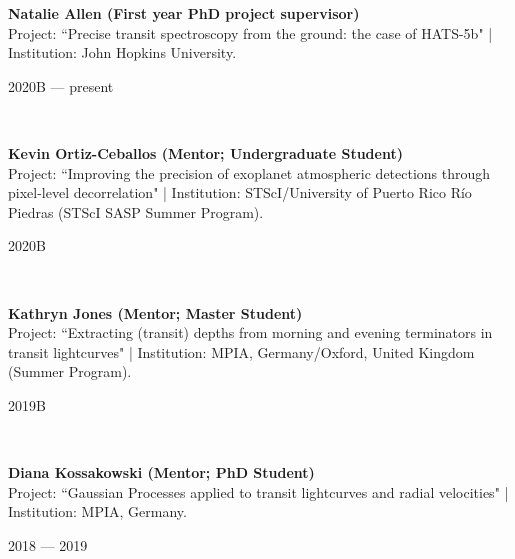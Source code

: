 \documentclass[12pt, a4paper]{article} %
\begin{document}
\begin{minipage}[t]{0.7\textwidth}
\begin{flushleft}%
  \setlength{\leftskip}{0.2cm}%
\textbf{Natalie Allen (First year PhD project supervisor)}\\
Project: ``Precise transit spectroscopy from the ground: the case of HATS-5b" | Institution: John Hopkins University.
\end{flushleft}
\end{minipage}
\begin{minipage}[t]{0.3\textwidth}
\hfill 2020B --- present
\end{minipage}\\

\begin{minipage}[t]{0.7\textwidth}
\begin{flushleft}%
  \setlength{\leftskip}{0.2cm}%
\textbf{Kevin Ortiz-Ceballos (Mentor; Undergraduate Student)}\\
Project: ``Improving the precision of exoplanet atmospheric detections through pixel-level decorrelation" | Institution: STScI/University of Puerto Rico Río Piedras (STScI SASP Summer Program).
\end{flushleft}
\end{minipage}
\begin{minipage}[t]{0.3\textwidth}
\hfill 2020B
\end{minipage}\\

\begin{minipage}[t]{0.7\textwidth}
\begin{flushleft}%
  \setlength{\leftskip}{0.2cm}%
\textbf{Kathryn Jones (Mentor; Master Student)}\\
Project: ``Extracting (transit) depths from morning and evening terminators in transit lightcurves" | Institution: MPIA, Germany/Oxford, United Kingdom (Summer Program).
\end{flushleft}
\end{minipage}
\begin{minipage}[t]{0.3\textwidth}
\hfill 2019B
\end{minipage}\\

\begin{minipage}[t]{0.7\textwidth}
\begin{flushleft}%
  \setlength{\leftskip}{0.2cm}%
\textbf{Diana Kossakowski (Mentor; PhD Student)}\\
Project: ``Gaussian Processes applied to transit lightcurves and radial velocities" | Institution: MPIA, Germany.
\end{flushleft}
\end{minipage}
\begin{minipage}[t]{0.3\textwidth}
\hfill 2018 --- 2019
\end{minipage}\\
\end{document}
